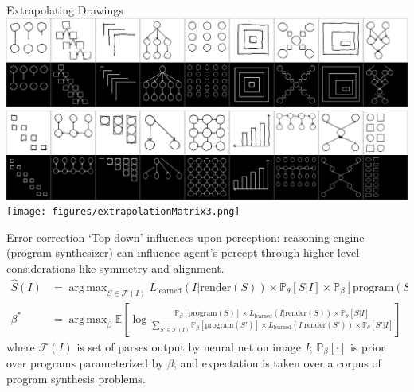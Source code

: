 \documentclass[final]{beamer}
\newcommand{\expect}{\mathds{E}} %
\newcommand{\probability}{\mathds{P}} %
\newlength{\onecolwid}
\newlength{\twocolwid}
\DeclareMathOperator*{\argmax}{arg\,max} %
\newcommand{\expect}{\mathds{E}} %
\newcommand{\probability}{\mathds{P}} %
\begin{document}
\begin{frame}[t]
\begin{columns}[t]
\begin{column}{\twocolwid}
\begin{columns}[t,totalwidth=\twocolwid]
\begin{column}{\onecolwid}
\begin{block}{Extrapolating Drawings}
      \includegraphics[width = \textwidth]{figures/extrapolationMatrix1.png}\\
  \includegraphics[width = \textwidth]{figures/extrapolationMatrix2.png}\\
  \texttt{[image: figures/extrapolationMatrix3.png]}  \\
  \end{block}

  \begin{block}{Error correction}
    `Top down' influences upon perception: reasoning engine (program synthesizer) can influence
    agent's percept through higher-level considerations like symmetry and alignment.
    \begin{align*}
      \hat{S}(I) &= \argmax_{S\in \mathcal{F}(I)} L_{\text{learned}}(I | \text{render}(S))\times \probability_\theta[S|I] \times\probability_{\beta} [ \text{program}(S)] \\
        \beta^* &= \argmax_{\beta} \expect \left[ \log \frac{\probability_{\beta} [\text{program}(S)]\times L_{\text{learned}}(I|\text{render}(S))\times \probability_\theta[S|I]}{\sum_{S'\in \mathcal{F}(I)} \probability_{\beta} [\text{program}(S')]\times L_{\text{learned}}(I|\text{render}(S'))\times \probability_\theta[S'|I]} \right]
    \end{align*}
    where $\mathcal{F}(I)$ is set of parses output by neural net on image $I$;
    $\probability_\beta[\cdot ]$ is prior over programs parameterized by $\beta$;
    and expectation is taken over a corpus of
    program synthesis problems.


\end{block}
\end{column}
\end{columns}
\end{column}
\end{columns}
\end{frame}
\end{document}

